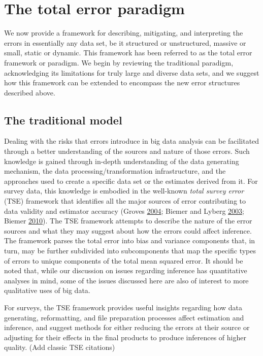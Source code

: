 \documentclass[]{krantz}
\begin{document}
\section{The total error paradigm}\label{sec:10-2}

We now provide a framework for describing, mitigating, and interpreting
the errors in essentially any data set, be it structured or
unstructured, massive or small, static or dynamic. This framework has
been referred to as the total error framework or paradigm. We begin by
reviewing the traditional paradigm, acknowledging its limitations for
truly large and diverse data sets, and we suggest how this framework can
be extended to encompass the new error structures described above.

\subsection{The traditional model}\label{sec:10-2.1}

Dealing with the risks that errors introduce in big data analysis can be
facilitated through a better understanding of the sources and nature of
those errors. Such knowledge is gained through in-depth understanding of
the data generating mechanism, the data processing/transformation
infrastructure, and the approaches used to create a specific data set or
the estimates derived from it. For survey data, this knowledge is
embodied in the well-known \emph{total survey error} (TSE) framework
that identifies all the major sources of error contributing to data
validity and estimator accuracy (Groves
\protect\hyperlink{ref-groves2004survey}{2004}; Biemer and Lyberg
\protect\hyperlink{ref-biemer2003}{2003}; Biemer
\protect\hyperlink{ref-biemer2010total}{2010}). The TSE framework
attempts to describe the nature of the error sources and what they may
suggest about how the errors could affect inference. The framework
parses the total error into bias and variance components that, in turn,
may be further subdivided into subcomponents that map the specific types
of errors to unique components of the total mean squared error. It
should be noted that, while our discussion on issues regarding inference
has quantitative analyses in mind, some of the issues discussed here are
also of interest to more qualitative uses of big data.

For surveys, the TSE framework provides useful insights regarding how
data generating, reformatting, and file preparation processes affect
estimation and inference, and suggest methods for either reducing the
errors at their source or adjusting for their effects in the final
products to produce inferences of higher quality. (Add classic TSE
citations)
\end{document}
